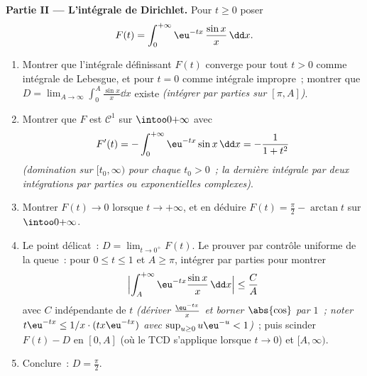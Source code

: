 \begin{problem}
\medskip
\noindent\textbf{Partie II --- L'intégrale de Dirichlet.}
Pour $t \geq 0$ poser
\[
F(t) = \int_0^{+\infty}\eu^{-tx}\,\frac{\sin x}{x}\,\dd x .
\]
\begin{enumerate}[resume]
  \item Montrer que l'intégrale définissant $F(t)$ converge
        pour tout $t > 0$ comme intégrale de Lebesgue, et
        pour $t = 0$ comme intégrale impropre~; montrer que
        $D = \lim_{A\to\infty}\int_0^A\frac{\sin x}x\dd x$
        existe \emph{(intégrer par parties sur $[\pi,
        A]$)}.
  \item Montrer que $F$ est $\mathcal C^1$ sur
        $\intoo0{+\infty}$ avec
        \[
        F'(t) = -\int_0^{+\infty}\eu^{-tx}\sin x\,\dd x
        = -\frac{1}{1 + t^2}
        \]
        \emph{(domination sur $[t_0, \infty)$ pour chaque
        $t_0 > 0$~; la dernière intégrale par deux
        intégrations par parties ou exponentielles
        complexes)}.
  \item Montrer $F(t) \to 0$ lorsque $t \to +\infty$, et en
        déduire $F(t) = \frac\pi2 - \arctan t$ sur
        $\intoo0{+\infty}$.
  \item Le point délicat~: $D = \lim_{t\to0^+}F(t)$. Le
        prouver par contrôle uniforme de la queue~: pour
        $0 \leq t \leq 1$ et $A \geq \pi$, intégrer par
        parties pour montrer
        \[
        \Bigl|\int_A^{+\infty}\eu^{-tx}\frac{\sin
        x}x\,\dd x\Bigr| \leq \frac{C}{A}
        \]
        avec $C$ indépendante de $t$ \emph{(dériver
        $\frac{\eu^{-tx}}x$ et borner $\abs{\cos}$ par
        $1$~; noter $t\eu^{-tx} \leq 1/x\cdot(tx\eu^{-tx})$
        avec $\sup_{u\geq0}u\eu^{-u} < 1$)}~; puis scinder
        $F(t) - D$ en $[0, A]$ (où le TCD s'applique
        lorsque $t \to 0$) et $[A, \infty)$.
  \item Conclure~: $D = \frac\pi2$.
\end{enumerate}


\end{problem}
